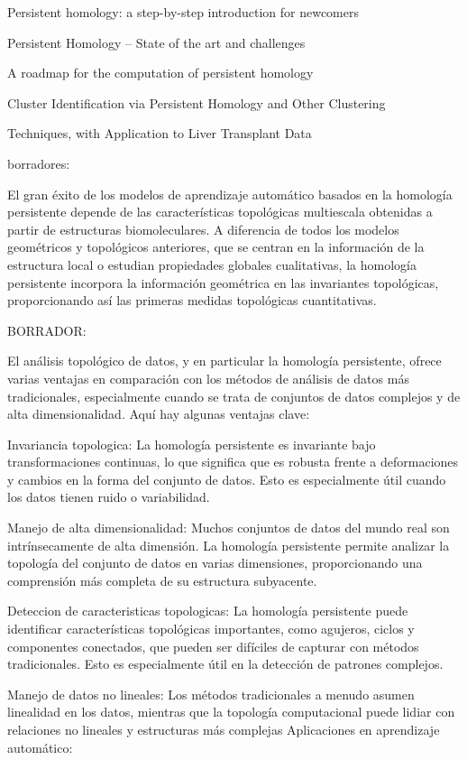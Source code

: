 \documentclass[a4paper,11pt]{article}
\begin{document}
Persistent homology: a step-by-step introduction for newcomers

Persistent Homology – State of the art and challenges 

A roadmap for the computation of persistent homology

Cluster Identification via Persistent Homology and Other Clustering 

Techniques, with Application to Liver Transplant Data



borradores:

El gran éxito de los modelos de aprendizaje automático basados en la homología persistente depende de las características topológicas multiescala obtenidas a partir de estructuras biomoleculares. A diferencia de todos los modelos geométricos y topológicos anteriores, que se centran en la información de la estructura local o estudian propiedades globales cualitativas, la homología persistente incorpora la información geométrica en las invariantes topológicas, proporcionando así las primeras medidas topológicas cuantitativas.

BORRADOR:

El análisis topológico de datos, y en particular la homología persistente, ofrece varias ventajas en comparación con los métodos de análisis de datos más tradicionales, especialmente cuando se trata de conjuntos de datos complejos y de alta dimensionalidad. Aquí hay algunas ventajas clave:

Invariancia topologica: La homología persistente es invariante bajo transformaciones continuas, lo que significa que es robusta frente a deformaciones y cambios en la forma del conjunto de datos. Esto es especialmente útil cuando los datos tienen ruido o variabilidad.

Manejo de alta dimensionalidad: Muchos conjuntos de datos del mundo real son intrínsecamente de alta dimensión. La homología persistente permite analizar la topología del conjunto de datos en varias dimensiones, proporcionando una comprensión más completa de su estructura subyacente.

Deteccion de caracteristicas topologicas:  La homología persistente puede identificar características topológicas importantes, como agujeros, ciclos y componentes conectados, que pueden ser difíciles de capturar con métodos tradicionales. Esto es especialmente útil en la detección de patrones complejos.

Manejo de datos no lineales: Los métodos tradicionales a menudo asumen linealidad en los datos, mientras que la topología computacional puede lidiar con relaciones no lineales y estructuras más complejas
Aplicaciones en aprendizaje automático:
\end{document}
